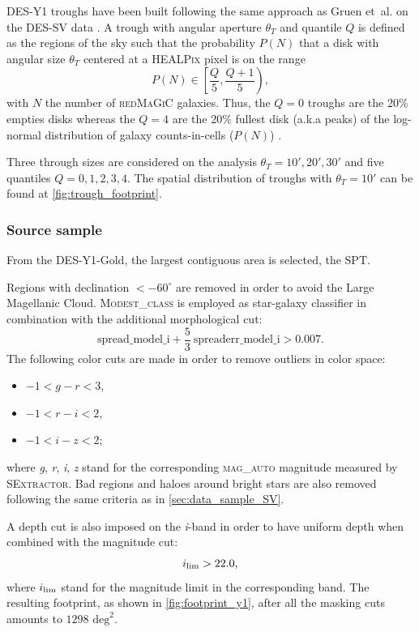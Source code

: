 DES-Y1 troughs have been built following the same approach as Gruen et~al. on the DES-SV data \cite{2016MNRAS.455.3367G}. A trough with angular aperture $\theta_T$ and quantile $Q$ is defined as the regions of the sky such that the probability $P(N)$ that a disk with angular size $\theta_T$ centered at a {\scshape HEALPix} pixel is on the range
\begin{equation}
P(N) \in \left[\frac{Q}{5},\frac{Q+1}{5}\right),
\end{equation}
with $N$ the number of {\scshape redMaGiC} galaxies. Thus, the $Q=0$ troughs are the 20\% empties disks whereas the $Q=4$ are the 20\% fullest disk (a.k.a peaks) of the log-normal distribution of galaxy counts-in-cells ($P(N)$) \cite{2017MNRAS.466.1444C}.
\newline

Three through sizes are considered on the analysis $\theta_T=10', 20', 30'$ and five quantiles $Q=0,1,2,3,4$. The spatial distribution of troughs with $\theta_T=10'$ can be found at \autoref{fig:trough_footprint}.

\subsubsection{Source sample}
From the DES-Y1-Gold, the largest contiguous area is selected, the SPT.
\newline

Regions with declination $ < -60^{\circ}$ are removed in order to avoid the Large Magellanic Cloud. {\scshape Modest\_class} is employed as star-galaxy classifier in combination with the additional morphological cut:
\begin{equation}
\mbox{spread\_model\_i} + \frac{5}{3}\ \mbox{spreaderr\_model\_i} > 0.007.
\end{equation}
The following color cuts are made in order to remove outliers in color space:
\begin{itemize}
	\item $-1 < g-r < 3$,
	\item $-1 < r-i < 2$,
	\item $-1 < i-z < 2$;
\end{itemize}
where {\it g}, {\it r}, {\it i}, {\it z} stand for the corresponding {\scshape mag\_auto} magnitude measured by {\scshape SExtractor}. Bad regions and haloes around bright stars are also removed following the same criteria as in \autoref{sec:data_sample_SV}.
\newline

A depth cut is also imposed on the {\it i}-band in order to have uniform depth when combined with the magnitude cut:
\begin{equation}
	i_{\rm lim} > 22.0,
\end{equation}
where $i_{\rm lim}$ stand for the magnitude limit in the corresponding band. The resulting footprint, as shown in \autoref{fig:footprint_y1}, after all the masking cuts amounts to $1298 \mbox{ deg}^2$.
\newline

